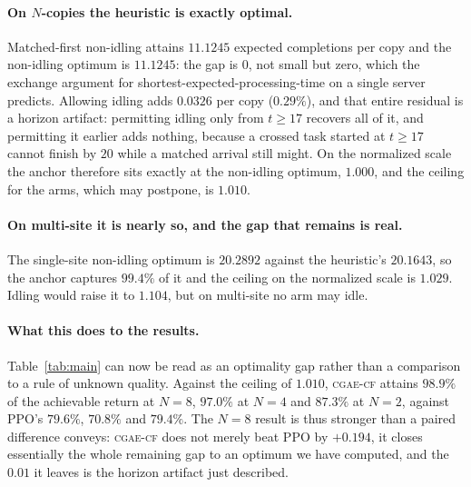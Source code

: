 \documentclass[review,authoryear,3p,times]{elsarticle}
\newcommand{\cflow}{\textsc{cgae-cf}}          %
\begin{document}
\paragraph{On $N$-copies the heuristic is exactly optimal.} Matched-first
non-idling attains $11.1245$ expected completions per copy and the non-idling
optimum is $11.1245$: the gap is $0$, not small but zero, which the exchange
argument for shortest-expected-processing-time on a single server predicts.
Allowing idling adds $0.0326$ per copy ($0.29\%$), and that entire residual is
a horizon artifact: permitting idling only from $t\ge17$ recovers all of it,
and permitting it earlier adds nothing, because a crossed task started at $t
\ge 17$ cannot finish by $20$ while a matched arrival still might. On the
normalized scale the anchor therefore sits exactly at the non-idling optimum,
$1.000$, and the ceiling for the arms, which may postpone, is $1.010$.

\paragraph{On multi-site it is nearly so, and the gap that remains is real.}
The single-site non-idling optimum is $20.2892$ against the heuristic's
$20.1643$, so the anchor captures $99.4\%$ of it and the ceiling on the
normalized scale is $1.029$. Idling would raise it to $1.104$, but on
multi-site no arm may idle.

\paragraph{What this does to the results.} Table~\ref{tab:main} can now be read
as an optimality gap rather than a comparison to a rule of unknown quality.
Against the ceiling of $1.010$, \cflow{} attains $98.9\%$ of the achievable
return at $N{=}8$, $97.0\%$ at $N{=}4$ and $87.3\%$ at $N{=}2$, against PPO's
$79.6\%$, $70.8\%$ and $79.4\%$. The $N{=}8$ result is thus stronger than a
paired difference conveys: \cflow{} does not merely beat PPO by $+0.194$, it
closes essentially the whole remaining gap to an optimum we have computed, and
the $0.01$ it leaves is the horizon artifact just described.
\end{document}
